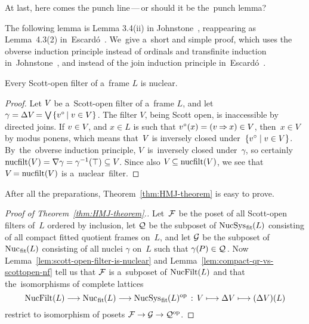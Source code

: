 \documentclass[11pt,letterpaper]{article}
\renewcommand{\thmskip}{\bigskip}
\renewcommand{\interskip}{\medskip}
\begin{document}
\txtskip

At last, here comes the punch line\,---\,or should it be the~punch lemma?

The following lemma is Lemma 3.4(ii) in Johnstone~\cite{johnstoneViet},
reappearing as Lemma~4.3(2) in~Escard\'o~\cite{escardo}.
We~give a~short and simple proof, which uses the obverse induction principle
	instead of ordinals and transfinite induction in~Johnstone~\cite{johnstoneViet},
	and instead of the join induction principle in~Escard\'o~\cite{escardo}.

\pagebreak[3]
\thmskip

\begin{lemma}\label{lem:scott-open-filter-is-nuclear}
Every Scott-open filter of a~frame\/ $L$ is nuclear.
\end{lemma}

\interskip

\begin{proof}
Let $V\mspace{-2mu}$ be a~Scott-open filter of a~frame $L$,
and let
	$\gamma = \fitnuc\negtinysp V\negdtinysp 
		= \Join\dtinysp\set{v\open\negdtinysp\suchthat v\in V}\tinysp$.
The filter $V$, being Scott open, is inaccessible by directed joins.
If $v\in V\mspace{-2mu}$, and $x\in L$ is such that $v{}^\circ(x) = (v\mathbin{\Rightarrow} x) \in V$,
then~$x\in V$ by modus ponens, which means that~$V\mspace{-2mu}$
is inversely closed under~$\{ v{}^\circ\mid v\in V \}$.
By~the~obverse induction principle, $V$~is~inversely closed under~$\gamma$,
so certainly
$\nucfilt(V)
	= \oneker\negtinysp\gamma
	= \gamma^{-1}(\top) \subseteq V\negdtinysp$.
Since also $V\mspace{-2mu}\subseteq\mathop{\smash{\mathrm{nucfilt}}}\nolimits(V)$,
we see that $V\mspace{-2mu}=\mathop{\smash{\mathrm{nucfilt}}}\nolimits(V)$ is a~nuclear~filter.
\end{proof}

\thmskip

After all the preparations,
Theorem~\ref{thm:HMJ-theorem} is easy to prove.

\thmskip

\begin{proof}[Proof of Theorem~\ref{thm:HMJ-theorem}.]
Let~$\mathcal{F}$ be the poset of all Scott-open filters of~$L$ ordered by inclusion,
let $\mathcal{Q}$ be the subposet of $\mathop{\smash{\mathrm{NucSys}}}\nolimits_{\mspace{1mu}\mathrm{fit}\mspace{-1mu}}(L)$
	consisting of all compact fitted quotient frames on~$L$,
and let $\mathcal{G}$ be the subposet of $\mathop{\smash{\mathrm{Nuc}}}\nolimits_{\mspace{1mu}\mathrm{fit}\mspace{-1mu}}(L)$
	consisting of all nuclei $\gamma$ on~$L$ such that $\gamma(\mspace{-1mu} P)\in\mathcal{Q}\mspace{2mu}$.
Now Lemma~\ref{lem:scott-open-filter-is-nuclear} and Lemma~\ref{lem:compact-qr-vs-scottopen-nf}
tell us that $\mathcal{F}$ is a~subposet of $\mathop{\smash{\mathrm{NucFilt}}}\nolimits(L)$
and that the~isomorphisms of complete lattices
%
\begin{equation*}
\NucFilt(L) \longto \FitNuc(L) \longto \FitNucSys(L)^\op
	\wide: V \longmapsto \fitnuc\negtinysp V \longmapsto (\fitnuc\negtinysp V)(L)
\end{equation*}
%
restrict to isomorphism of posets $\mathcal{F} \to \mathcal{G} \to \mathcal{Q}^\mathrm{op}$.
\end{proof}
\end{document}

